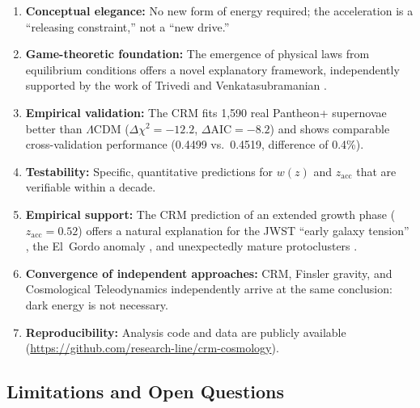 \documentclass[aps,prd,twocolumn,superscriptaddress,nofootinbib]{revtex4-2}
\begin{document}
\begin{enumerate}
\item \textbf{Conceptual elegance:} No new form of energy required; the acceleration is a ``releasing constraint,'' not a ``new drive.''
\item \textbf{Game-theoretic foundation:} The emergence of physical laws from equilibrium conditions offers a novel explanatory framework, independently supported by the work of Trivedi and Venkatasubramanian \cite{Trivedi2025}.
\item \textbf{Empirical validation:} The CRM fits 1,590 real Pantheon+ supernovae better than $\Lambda$CDM ($\Delta\chi^2 = -12.2$, $\Delta\mathrm{AIC} = -8.2$) and shows comparable cross-validation performance (0.4499 vs.\ 0.4519, difference of 0.4\%).
\item \textbf{Testability:} Specific, quantitative predictions for $w(z)$ and $z_{\mathrm{acc}}$ that are verifiable within a decade.
\item \textbf{Empirical support:} The CRM prediction of an extended growth phase ($z_{\mathrm{acc}} = 0.52$) offers a natural explanation for the JWST ``early galaxy tension'' \cite{Labbe2023, BoylanKolchin2023}, the El~Gordo anomaly \cite{Asencio2023}, and unexpectedly mature protoclusters \cite{Miller2018}.
\item \textbf{Convergence of independent approaches:} CRM, Finsler gravity, and Cosmological Teleodynamics independently arrive at the same conclusion: dark energy is not necessary.
\item \textbf{Reproducibility:} Analysis code and data are publicly available (\url{https://github.com/research-line/crm-cosmology}).
\end{enumerate}

\subsection{Limitations and Open Questions}
\end{document}
